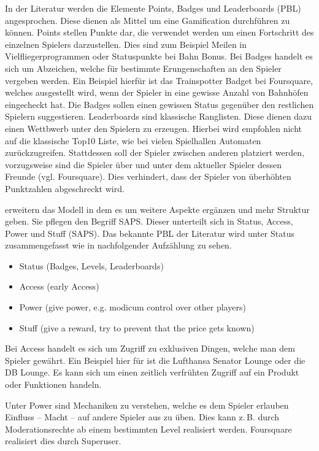 In der Literatur werden die Elemente Points, Badges und Leaderboards (PBL) angesprochen. Diese dienen als Mittel um eine Gamification durchführen zu können. 
Points stellen Punkte dar, die verwendet werden um einen Fortschritt des einzelnen Spielers darzustellen. Dies sind zum Beispiel Meilen in Vielfliegerprogrammen oder Statuspunkte bei Bahn Bonus.
Bei Badges handelt es sich um Abzeichen, welche für bestimmte Erungenschaften an den Spieler vergeben werden. Ein Beispiel hierfür ist das Trainspotter Badget bei Foursquare, welches ausgestellt wird, wenn der Spieler in eine gewisse Anzahl von Bahnhöfen eingecheckt hat. Die Badges sollen einen gewissen Status gegenüber den restlichen Spielern suggestieren.
Leaderboards sind klassische Ranglisten. Diese dienen dazu einen Wettbwerb unter den Spielern zu erzeugen. Hierbei wird empfohlen nicht auf die klassische Top10 Liste, wie bei vielen Spielhallen Automaten zurückzugreifen. Stattdessen soll der Spieler zwischen anderen platziert werden, vorzugsweise sind die Spieler über und unter dem aktueller Spieler dessen Freunde (vgl. Foursquare). Dies verhindert, dass der Spieler von überhöhten Punktzahlen abgeschreckt wird.

\cite{Zichermann.2011} erweitern das Modell in dem es um weitere Aspekte ergänzen und mehr Struktur geben.
Sie pflegen den Begriff SAPS. Dieser unterteilt sich in Status, Access, Power und Stuff (SAPS).
Das bekannte PBL der Literatur wird unter Status zusammengefasst wie in nachfolgender Aufzählung zu sehen.

\begin{itemize}
\item Status (Badges, Levels, Leaderboards)
\item Access (early Access)
\item Power (give power, e.g. modicum control over other players)
\item Stuff (give a reward, try to prevent that the price gets known)
\end{itemize}

Bei Access handelt es sich um \glqq Zugriff \grqq zu exklusiven Dingen, welche man dem Spieler gewährt. Ein Beispiel hier für ist die Lufthansa Senator Lounge oder die DB Lounge.
Es kann sich um einen zeitlich verfrühten Zugriff auf ein Produkt oder Funktionen handeln.

Unter Power sind Mechaniken zu verstehen, welche es dem Spieler erlauben Einfluss -- Macht -- auf andere Spieler aus zu üben. Dies kann z.\,B. durch Moderationsrechte ab einem bestimmten Level realisiert werden. Foursquare realisiert dies durch Superuser.

